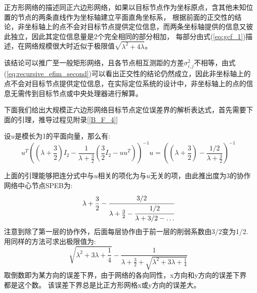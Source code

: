 正方形网络的描述同正六边形网络，如果以目标节点作为坐标原点，含其他未知位置的节点的两条直线作为坐标轴建立平面直角坐标系，
根据前面的正交性的结论，非坐标轴上的点不会对目标节点提供定位信息，而两条坐标轴提供的信息又彼此独立，因此其定位信息量是2个完全相同的部分相加，
每部分由式(\ref{eq:gcf_1})描述，在网络规模很大时近似于极限值$\sqrt{\lambda^2+4\lambda}$。

该结论可以推广至一般矩形网络，且各节点相互测距的方差$\sigma^2_{i,j}$不相等，由式(\ref{eq:recursive_efim_second})可以看出正交性的结论仍然成立，因此非坐标轴上的点不会对目标节点提供定位信息，在实际定位系统的设计中，非坐标轴上的点的信息无需传到目标节点或中央处理器进行解算。

下面我们给出大规模正六边形网络目标节点定位误差界的解析表达式，首先需要下面的引理，推导过程见附录[\ref{B_F_4}]
\begin{lemma}\label{lemma:hexagon}
  设$u$是模长为1的平面向量，那么有:
\begin{equation}\label{eq:equiv}
  u^T((\lambda+\frac{3}{2})I_2-\frac{1}{\lambda+\frac{3}{2}}(\frac{3}{2}I_2-uu^T))^{-1}u
  =((\lambda+\frac{3}{2})-\frac{1/2}{\lambda+\frac{3}{2}})^{-1}
\end{equation}
\end{lemma}
  上面的引理能够把连分式中与$u$相关的项化为与$u$无关的项，由此推出度为3的协作网络中心节点SPEB为:
  \[
\lambda+\frac{3}{2}-\cfrac{3/2}{\lambda+\frac{3}{2}-\cfrac{1/2}{\lambda+3/2-\dots}}
  \]
  注意到除了第一层的协作外，后面每层协作由于前一层的削弱系数由3/2变为1/2.
  用同样的方法可求出极限值为:
  \[
  \sqrt{\lambda^2+3\lambda+\frac{1}{4}}-\frac{1}{\lambda+\frac{3}{2}+\sqrt{\lambda^2+3\lambda+\frac{1}{4}}}
  \]
  取倒数即为某方向的误差下界，由于网络的各向同性，x方向和y方向的误差下界都是这个数。
该误差下界总是比正方形网格x或y方向的误差大。

